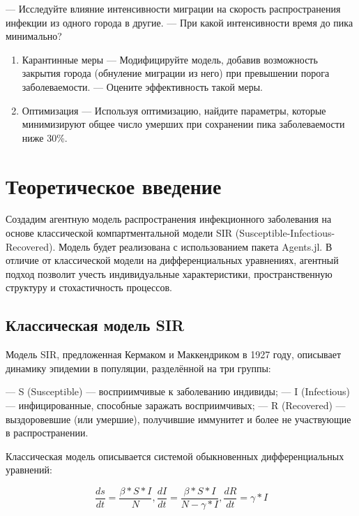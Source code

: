 \documentclass[
  12pt,
  a4paper,
  DIV=11,
  numbers=noendperiod]{scrreprt}
\begin{document}
--- Исследуйте влияние интенсивности миграции на скорость
распространения инфекции из одного города в другие. --- При какой
интенсивности время до пика минимально?

\begin{enumerate}
\def\labelenumi{\arabic{enumi}.}
\setcounter{enumi}{4}
\item
  Карантинные меры --- Модифицируйте модель, добавив возможность
  закрытия города (обнуление миграции из него) при превышении порога
  заболеваемости. --- Оцените эффективность такой меры.
\item
  Оптимизация --- Используя оптимизацию, найдите параметры, которые
  минимизируют общее число умерших при сохранении пика заболеваемости
  ниже 30\%.
\end{enumerate}

\chapter{Теоретическое
введение}\label{ux442ux435ux43eux440ux435ux442ux438ux447ux435ux441ux43aux43eux435-ux432ux432ux435ux434ux435ux43dux438ux435}

Создадим агентную модель распространения инфекционного заболевания на
основе классической компартментальной модели SIR
(Susceptible-Infectious-Recovered). Модель будет реализована с
использованием пакета Agents.jl. В отличие от классической модели на
дифференциальных уравнениях, агентный подход позволит учесть
индивидуальные характеристики, пространственную структуру и
стохастичность процессов.

\section{Классическая модель
SIR}\label{ux43aux43bux430ux441ux441ux438ux447ux435ux441ux43aux430ux44f-ux43cux43eux434ux435ux43bux44c-sir}

Модель SIR, предложенная Кермаком и Маккендриком в 1927 году, описывает
динамику эпидемии в популяции, разделённой на три группы:

--- S (Susceptible) --- восприимчивые к заболеванию индивиды; --- I
(Infectious) --- инфицированные, способные заражать восприимчивых; --- R
(Recovered) --- выздоровевшие (или умершие), получившие иммунитет и
более не участвующие в распространении.

Классическая модель описывается системой обыкновенных дифференциальных
уравнений:

\[
\frac{ds}{dt} = \frac{\beta*S*I}{N},
\frac{dI}{dt} = \frac{\beta*S*I}{N - \gamma*I},
\frac{dR}{dt} = \gamma*I
\]
\end{document}
